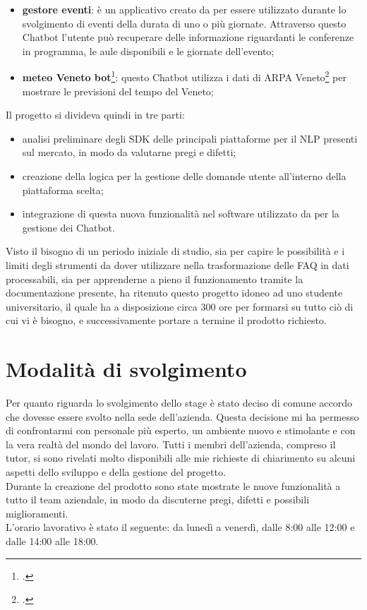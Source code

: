 \begin{itemize}
	\item \textbf{gestore eventi}: è un applicativo creato da \azienda{} per essere utilizzato durante lo svolgimento di eventi della durata di uno o più giornate. Attraverso questo \gls{Chatbot} l'utente può recuperare delle informazione riguardanti le conferenze in programma, le aule disponibili e le giornate dell'evento;
	\item \textbf{meteo Veneto bot}\footcite{meteo}: questo \gls{Chatbot} utilizza i dati di ARPA Veneto\footcite{arpav} per mostrare le previsioni del tempo del Veneto;
\end{itemize}
Il progetto si divideva quindi in tre parti:
\begin{itemize}
	\item analisi preliminare degli \gls{SDK} delle principali piattaforme per il \gls{NLP} presenti sul mercato, in modo da valutarne pregi e difetti;
	\item creazione della logica per la gestione delle domande utente all'interno della piattaforma scelta;
	\item integrazione di questa nuova funzionalità nel software utilizzato da \azienda{} per la gestione dei \gls{Chatbot}. 
\end{itemize}
Visto il bisogno di un periodo iniziale di studio, sia per capire le possibilità e i limiti degli strumenti da dover utilizzare nella trasformazione delle \gls{FAQ} in dati processabili, sia per apprenderne a pieno il funzionamento tramite la documentazione presente, \azienda{} ha ritenuto questo progetto idoneo ad uno studente universitario, il quale ha a disposizione circa 300 ore per formarsi su tutto ciò di cui vi è bisogno, e successivamente portare a termine il prodotto richiesto.

\section{Modalità di svolgimento}
Per quanto riguarda lo svolgimento dello stage è stato deciso di comune accordo che dovesse essere svolto nella sede dell'azienda. Questa decisione mi ha permesso di confrontarmi con personale più esperto, un ambiente nuovo e stimolante e con la vera realtà del mondo del lavoro. Tutti i membri dell'azienda, compreso il tutor, si sono rivelati molto disponibili alle mie richieste di chiarimento su alcuni aspetti dello sviluppo e della gestione del progetto.\\
Durante la creazione del prodotto sono state mostrate le nuove funzionalità a tutto il team aziendale, in modo da discuterne pregi, difetti e possibili miglioramenti. \\
L'orario lavorativo è stato il seguente: da lunedì a venerdì, dalle 8:00 alle 12:00 e dalle 14:00 alle 18:00.

